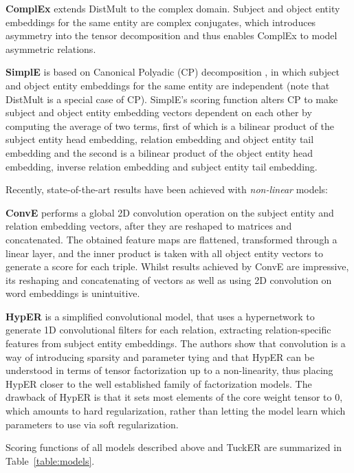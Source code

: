 \documentclass[11pt,a4paper]{article}
\begin{document}
\noindent\textbf{ComplEx} \cite{trouillon2016complex} extends DistMult to the complex domain. Subject and object entity embeddings for the same entity are complex conjugates, which introduces asymmetry into the tensor decomposition and thus enables ComplEx to model asymmetric relations.

\noindent\textbf{SimplE} \cite{kazemi2018simple} is based on Canonical Polyadic (CP) decomposition \cite{hitchcock1927expression}, in which subject and object entity embeddings for the same entity are independent (note that DistMult is a special case of CP). SimplE's scoring function alters CP to make subject and object entity embedding vectors dependent on each other by computing the average of two terms, first of which is a bilinear product of the subject entity head embedding, relation embedding and object entity tail embedding and the second is a bilinear product of the object entity head embedding, inverse relation embedding and subject entity tail embedding.

Recently, state-of-the-art results have been achieved with \textit{non-linear} models:

\noindent\textbf{ConvE} \cite{dettmers2018convolutional} performs a global 2D convolution operation on the subject entity and relation embedding vectors, after they are reshaped to matrices and concatenated. The obtained feature maps are flattened, transformed through a linear layer, and the inner product is taken with all object entity vectors to generate a score for each triple. Whilst results achieved by ConvE are impressive, its reshaping and concatenating of vectors as well as using 2D convolution on word embeddings is unintuitive. 

\noindent\textbf{HypER} \cite{balazevic2019hypernetwork} is a simplified convolutional model, that uses a hypernetwork to generate 1D convolutional filters for each relation, extracting relation-specific features from subject entity embeddings. The authors show that convolution is a way of introducing sparsity and parameter tying and that HypER can be understood in terms of tensor factorization up to a non-linearity, thus placing  HypER closer to the well established family of factorization models. The drawback of HypER is that it sets most elements of the core weight tensor to 0, which amounts to hard regularization, rather than letting the model learn which parameters to use via soft regularization. 

Scoring functions of all models described above and TuckER are summarized in Table~\ref{table:models}.
\end{document}
